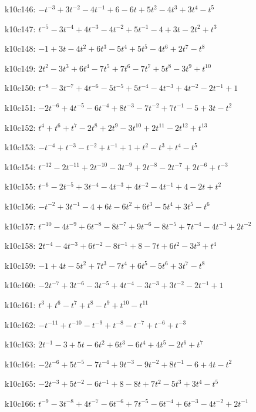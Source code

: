 k10c146: $-t^{-3}+3t^{-2}-4t^{-1}+6-6t+5t^{2}-4t^{3}+3t^{4}-t^{5}$

k10c147: $t^{-5}-3t^{-4}+4t^{-3}-4t^{-2}+5t^{-1}-4+3t-2t^{2}+t^{3}$

k10c148: $-1+3t-4t^{2}+6t^{3}-5t^{4}+5t^{5}-4t^{6}+2t^{7}-t^{8}$

k10c149: $2t^{2}-3t^{3}+6t^{4}-7t^{5}+7t^{6}-7t^{7}+5t^{8}-3t^{9}+t^{10}$

k10c150: $t^{-8}-3t^{-7}+4t^{-6}-5t^{-5}+5t^{-4}-4t^{-3}+4t^{-2}-2t^{-1}+1$

k10c151: $-2t^{-6}+4t^{-5}-6t^{-4}+8t^{-3}-7t^{-2}+7t^{-1}-5+3t-t^{2}$

k10c152: $t^{4}+t^{6}+t^{7}-2t^{8}+2t^{9}-3t^{10}+2t^{11}-2t^{12}+t^{13}$

k10c153: $-t^{-4}+t^{-3}-t^{-2}+t^{-1}+1+t^{2}-t^{3}+t^{4}-t^{5}$

k10c154: $t^{-12}-2t^{-11}+2t^{-10}-3t^{-9}+2t^{-8}-2t^{-7}+2t^{-6}+t^{-3}$

k10c155: $t^{-6}-2t^{-5}+3t^{-4}-4t^{-3}+4t^{-2}-4t^{-1}+4-2t+t^{2}$

k10c156: $-t^{-2}+3t^{-1}-4+6t-6t^{2}+6t^{3}-5t^{4}+3t^{5}-t^{6}$

k10c157: $t^{-10}-4t^{-9}+6t^{-8}-8t^{-7}+9t^{-6}-8t^{-5}+7t^{-4}-4t^{-3}+2t^{-2}$

k10c158: $2t^{-4}-4t^{-3}+6t^{-2}-8t^{-1}+8-7t+6t^{2}-3t^{3}+t^{4}$

k10c159: $-1+4t-5t^{2}+7t^{3}-7t^{4}+6t^{5}-5t^{6}+3t^{7}-t^{8}$

k10c160: $-2t^{-7}+3t^{-6}-3t^{-5}+4t^{-4}-3t^{-3}+3t^{-2}-2t^{-1}+1$

k10c161: $t^{3}+t^{6}-t^{7}+t^{8}-t^{9}+t^{10}-t^{11}$

k10c162: $-t^{-11}+t^{-10}-t^{-9}+t^{-8}-t^{-7}+t^{-6}+t^{-3}$

k10c163: $2t^{-1}-3+5t-6t^{2}+6t^{3}-6t^{4}+4t^{5}-2t^{6}+t^{7}$

k10c164: $-2t^{-6}+5t^{-5}-7t^{-4}+9t^{-3}-9t^{-2}+8t^{-1}-6+4t-t^{2}$

k10c165: $-2t^{-3}+5t^{-2}-6t^{-1}+8-8t+7t^{2}-5t^{3}+3t^{4}-t^{5}$

k10c166: $t^{-9}-3t^{-8}+4t^{-7}-6t^{-6}+7t^{-5}-6t^{-4}+6t^{-3}-4t^{-2}+2t^{-1}$

